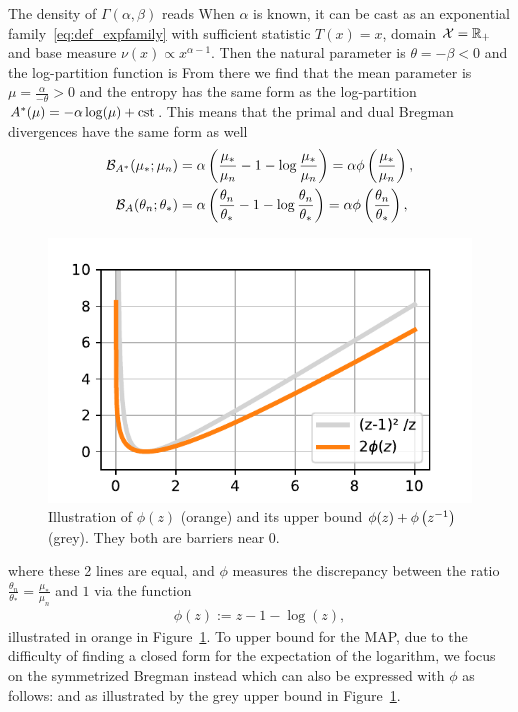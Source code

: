 \documentclass[twoside]{article}
\newcommand{\logpart}{A}
\newcommand{\conj}{{\logpart^*}}
\newcommand{\bregman}{\cB_\logpart}
\newcommand{\bregmanconj}{\cB_{\logpart^*}}
\newcommand{\nat}{\theta}
\newcommand{\m}{\mu}
\begin{document}
The density of $\Gamma(\alpha,\beta)$ reads
When $\alpha$ is known, it can be cast as an exponential family~\eqref{eq:def_expfamily} with sufficient statistic $T(x)=x$, domain ${\mathcal X} = \mathbb{R}_+$ and base measure $\nu(x)\propto x^{\alpha-1}$. Then the natural parameter is $\nat = -\beta < 0$ and the log-partition function is
\alignn{
	\logpart (\nat) = -\alpha \log(-\nat)  + \log\Gamma(\alpha) \; .
}
From there we find that the mean parameter is $\mu = \frac{\alpha}{-\nat} >0$ and the entropy has the same form as the log-partition $\conj(\mu) = - \alpha \log(\mu) + \cst$.
This means that the primal and dual Bregman divergences have the same form as well
\begin{align}
	\bregmanconj(\m_*; \m_n) 
	&= \alpha \left ( \frac{\m_*}{ \m_n} - 1 - \log  \frac{\m_*}{ \m_n} \right) 
	= \alpha \phi\paren{\frac{\m_*}{ \m_n}},
	\\
	\bregman( \nat_n; \nat_* ) 
	&=  \alpha \left ( \frac{ \nat_n}{\nat_*} - 1 - \log  \frac{ \nat_n}{\nat_*} \right)
	= \alpha \phi\paren{\frac{ \nat_n}{\nat_*}},
\end{align}
\begin{figure}
	\centering
	\includegraphics[width=.38\textwidth]{phi.pdf}
	\caption{%
	Illustration of $\phi(z)$ (orange) and its upper bound $\phi(z) + \phi\left(z^{-1}\right)$ (grey).
	They both are barriers near $0$.
	}
	\label{fig:phi}
\end{figure}
where these 2 lines are equal, and $\phi$ measures the discrepancy between the ratio $\frac{ \nat_n}{\nat_*} =  \frac{\m_*}{ \m_n}  $ and $1$ via the function
\begin{align}
	\phi(z) := z - 1 - \log(z),
\end{align}
illustrated in orange in Figure~\ref{fig:phi}.
To upper bound for the MAP, due to the difficulty of finding a closed form for the expectation of the logarithm, we focus on the symmetrized Bregman instead
\alignn{
	\bregmanconj( \mu_*; \mu_n) 
	\leq \cS_{\conj} (\mu_*, \mu_n )
	&:= \bregmanconj( \mu_*; \mu_n)  + \bregmanconj( \mu_n; \mu_*) \nonumber\\
	&=  \alpha \paren{\frac{ \mu_*}{\mu_n} -1 +\frac{ \mu_n}{\mu_*} - 1 },
	\label{eq:symmetrized_bregman}
}
which can also be expressed with $\phi$ as follows:
and as illustrated by the grey upper bound in Figure~\ref{fig:phi}.
\end{document}
